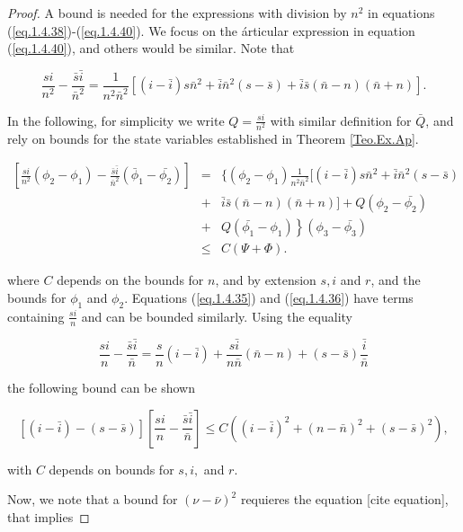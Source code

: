 \begin{proof}
A bound is needed for the expressions with division by $n^2$ in equations 
(\ref{eq.1.4.38})-(\ref{eq.1.4.40}). We focus on the árticular expression in 
equation (\ref{eq.1.4.40}), and others would be similar. Note that

\begin{equation*}
\frac{si}{n^2}-\frac{\bar{s}\bar{i}}{\bar{n}^2}=\frac{1}{n^2\bar{n}^2}[(i-\bar{i})s\bar{n}^2+\bar{i}\bar{n}^2(s-\bar{s})+\bar{i}\bar{s}(\bar{n}-n)(\bar{n}+n)].
\end{equation*}

In the following, for simplicity we write $Q=\frac{si}{n^2}$ with similar 
definition for $\bar{Q}$, and rely on bounds for the state variables 
established in Theorem \ref{Teo.Ex.Ap}.

\begin{eqnarray}
\left[\frac{si}{n^2}(\phi_2-\phi_1)-\frac{\bar{s}\bar{i}}{\bar{n}^2}(\bar{\phi}_1-\bar{\phi_2})\right]&=&\{(\phi_2-\phi_1)\frac{1}{n^2\bar{n}^2}[(i-\bar{i})s\bar{n}^2+\bar{i}\bar{n}^2(s-\bar{s})\nonumber\\
&+&\bar{i}\bar{s}(\bar{n}-n)(\bar{n}+n)]+Q(\phi_2-\bar{\phi_2})\nonumber\\
&+&\left. Q(\bar{\phi_1}-\phi_1)\right\}(\phi_3-\bar{\phi_3})\nonumber \\
&\leq& C(\Psi+\Phi). \label{eq.1.4.44}
\end{eqnarray}

where $C$ depends on the bounds for $n$, and by extension $s,i$ and $r$, and 
the bounds for $\phi_1$ and $\phi_2$. Equations (\ref{eq.1.4.35}) and 
(\ref{eq.1.4.36}) have terms containing $\frac{si}{n}$ and can be bounded 
similarly. Using the equality

\begin{equation*}
\frac{si}{n}-\frac{\bar{s}\bar{i}}{\bar{n}}=\frac{s}{n}(i-\bar{i})+\frac{s\bar{i}}{n\bar{n}}(\bar{n}-n)+(s-\bar{s})\frac{\bar{i}}{\bar{n}}
\end{equation*}

the following bound can be shown

\begin{equation}\label{eq.1.4.45}
[(i-\bar{i})-(s-\bar{s})]\left[\frac{si}{n}-\frac{\bar{s}\bar{i}}{\bar{n}}\right]\leq
 C((i-\bar{i})^2+(n-\bar{n})^2+(s-\bar{s})^2),
\end{equation}

with $C$ depends on bounds for $s,i,$ and $r$.

Now, we note that a bound for $(\nu-\bar{\nu})^2$ requieres the equation [cite 
equation], that implies


\end{proof}
